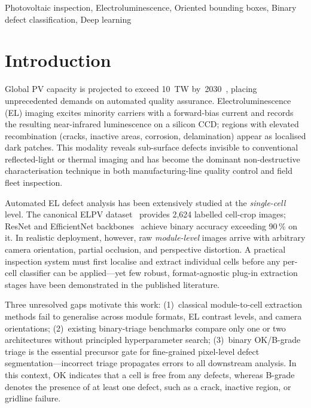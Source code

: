 \documentclass[conference]{IEEEtran}
\begin{document}
\begin{IEEEkeywords}
Photovoltaic inspection, Electroluminescence, Oriented bounding boxes, Binary defect classification, Deep learning
\end{IEEEkeywords}

\section{Introduction}

Global PV capacity is projected to exceed 10~TW by~2030~\cite{iea2023}, placing unprecedented demands on automated quality assurance. Electroluminescence (EL) imaging excites minority carriers with a forward-bias current and records the resulting near-infrared luminescence on a silicon CCD; regions with elevated recombination (cracks, inactive areas, corrosion, delamination) appear as localised dark patches. This modality reveals sub-surface defects invisible to conventional reflected-light or thermal imaging and has become the dominant non-destructive characterisation technique in both manufacturing-line quality control and field fleet inspection.

Automated EL defect analysis has been extensively studied at the \textit{single-cell} level. The canonical ELPV dataset~\cite{deitsch2019} provides 2{,}624 labelled cell-crop images; ResNet and EfficientNet backbones~\cite{he2016,tan2019} achieve binary accuracy exceeding 90\,\% on it. In realistic deployment, however, raw \textit{module-level} images arrive with arbitrary camera orientation, partial occlusion, and perspective distortion. A practical inspection system must first localise and extract individual cells before any per-cell classifier can be applied---yet few robust, format-agnostic plug-in extraction stages have been demonstrated in the published literature.

Three unresolved gaps motivate this work: (1)~classical module-to-cell extraction methods fail to generalise across module formats, EL contrast levels, and camera orientations; (2)~existing binary-triage benchmarks compare only one or two architectures without principled hyperparameter search; (3)~binary OK/B-grade triage is the essential precursor gate for fine-grained pixel-level defect segmentation---incorrect triage propagates errors to all downstream analysis. In this context, OK indicates that a cell is free from any defects, whereas B-grade denotes the presence of at least one defect, such as a crack, inactive region, or gridline failure.
\end{document}
